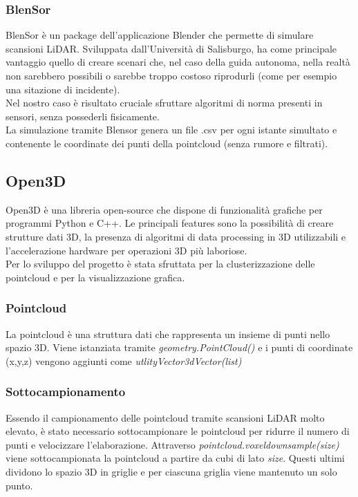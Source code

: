 \documentclass[italian]{article}
\begin{document}
\subsubsection{BlenSor}
BlenSor è un package dell'applicazione Blender che permette di simulare scansioni LiDAR. Sviluppata dall'Università di Salisburgo, ha come principale vantaggio quello di creare scenari che, nel caso della guida autonoma, nella realtà non sarebbero possibili o sarebbe troppo costoso riprodurli (come per esempio una sitazione di incidente).\\
Nel nostro caso è risultato cruciale sfruttare algoritmi di norma presenti in sensori, senza possederli fisicamente.\\
La simulazione tramite Blensor genera un file .csv per ogni istante simultato e contenente le coordinate dei punti della pointcloud (senza rumore e filtrati).%
\subsection{Open3D}
Open3D è una libreria open-source che dispone di funzionalità grafiche per programmi Python e C++. Le principali features sono la possibilità di creare strutture dati 3D, la presenza di algoritmi di data processing in 3D utilizzabili e l'accelerazione hardware per operazioni 3D più laboriose.\\
Per lo sviluppo del progetto è stata sfruttata per la clusterizzazione delle pointcloud e per la visualizzazione grafica.
\subsubsection{Pointcloud}
La pointcloud è una struttura dati che rappresenta un insieme di punti nello spazio 3D. Viene istanziata tramite \textit{geometry.PointCloud()} e i punti di coordinate (x,y,z) vengono aggiunti come \textit{utlityVector3dVector(list)}\\
\subsubsection*{Sottocampionamento}
Essendo il campionamento delle pointcloud tramite scansioni LiDAR molto elevato, è stato necessario sottocampionare le pointcloud per ridurre il numero di punti e velocizzare l'elaborazione. Attraverso \textit{pointcloud.voxeldownsample(size)}  viene sottocampionata la pointcloud a partire da cubi di lato \textit{size}. Questi ultimi dividono lo spazio 3D in griglie e per ciascuna griglia viene mantenuto un solo punto.
\end{document}
